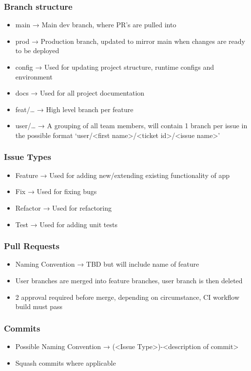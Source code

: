 \documentclass{article}
\begin{document}
	\subsubsection{Branch structure}
	\begin{itemize}
		\item main → Main dev branch, where PR’s are pulled into
		\item prod → Production branch, updated to mirror main when changes are ready to be deployed
		\item config → Used for updating project structure, runtime configs and environment
		\item docs → Used for all project documentation
		\item feat/… → High level branch per feature
		\item user/… → A grouping of all team members, will contain 1 branch per issue in the possible format ‘user/\textless first name\textgreater/\textless ticket id\textgreater/\textless issue name\textgreater’
	\end{itemize}

	\subsubsection{Issue Types}
	\begin{itemize}
		\item Feature → Used for adding new/extending existing functionality of app
		\item Fix → Used for fixing bugs
		\item Refactor → Used for refactoring
		\item Test → Used for adding unit tests
	\end{itemize}

	\subsubsection{Pull Requests}
	\begin{itemize}
		\item Naming Convention → TBD but will include name of feature
		\item User branches are merged into feature branches, user branch is then deleted
		\item 2 approval required before merge, depending on circumstance, CI workflow build must pass
	\end{itemize}

	\subsubsection{Commits}
	\begin{itemize}
		\item Possible Naming Convention → (\textless Issue Type\textgreater)-\textless description of commit\textgreater
		\item Squash commits where applicable
	\end{itemize}
\end{document}

